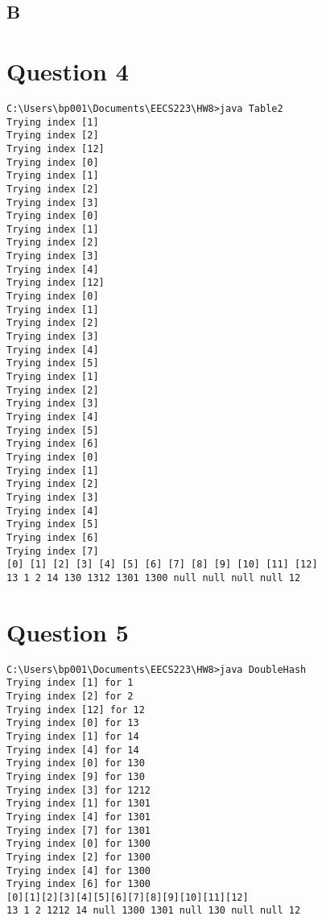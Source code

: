 \documentclass[12pt]{article} %
\begin{document}
\subsection{B}
\noindent{}
\section{Question 4}
\begin{lstlisting}
C:\Users\bp001\Documents\EECS223\HW8>java Table2
Trying index [1]
Trying index [2]
Trying index [12]
Trying index [0]
Trying index [1]
Trying index [2]
Trying index [3]
Trying index [0]
Trying index [1]
Trying index [2]
Trying index [3]
Trying index [4]
Trying index [12]
Trying index [0]
Trying index [1]
Trying index [2]
Trying index [3]
Trying index [4]
Trying index [5]
Trying index [1]
Trying index [2]
Trying index [3]
Trying index [4]
Trying index [5]
Trying index [6]
Trying index [0]
Trying index [1]
Trying index [2]
Trying index [3]
Trying index [4]
Trying index [5]
Trying index [6]
Trying index [7]
[0] [1] [2] [3] [4] [5] [6] [7] [8] [9] [10] [11] [12]
13 1 2 14 130 1312 1301 1300 null null null null 12
\end{lstlisting}
\section{Question 5}
\begin{lstlisting}
C:\Users\bp001\Documents\EECS223\HW8>java DoubleHash
Trying index [1] for 1
Trying index [2] for 2
Trying index [12] for 12
Trying index [0] for 13
Trying index [1] for 14
Trying index [4] for 14
Trying index [0] for 130
Trying index [9] for 130
Trying index [3] for 1212
Trying index [1] for 1301
Trying index [4] for 1301
Trying index [7] for 1301
Trying index [0] for 1300
Trying index [2] for 1300
Trying index [4] for 1300
Trying index [6] for 1300
[0][1][2][3][4][5][6][7][8][9][10][11][12]
13 1 2 1212 14 null 1300 1301 null 130 null null 12
\end{lstlisting}
\end{document}
